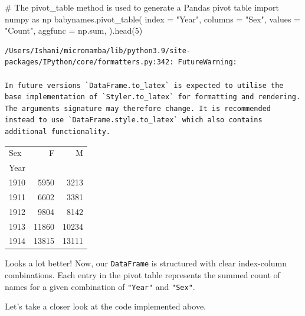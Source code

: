 \documentclass[
  letterpaper,
  DIV=11,
  numbers=noendperiod]{scrreprt}
\newenvironment{Shaded}{\begin{snugshade}}{\end{snugshade}}
\newcommand{\BuiltInTok}[1]{\textcolor[rgb]{0.00,0.23,0.31}{#1}}
\newcommand{\CommentTok}[1]{\textcolor[rgb]{0.37,0.37,0.37}{#1}}
\newcommand{\DecValTok}[1]{\textcolor[rgb]{0.68,0.00,0.00}{#1}}
\newcommand{\ImportTok}[1]{\textcolor[rgb]{0.00,0.46,0.62}{#1}}
\newcommand{\NormalTok}[1]{\textcolor[rgb]{0.00,0.23,0.31}{#1}}
\newcommand{\OperatorTok}[1]{\textcolor[rgb]{0.37,0.37,0.37}{#1}}
\newcommand{\StringTok}[1]{\textcolor[rgb]{0.13,0.47,0.30}{#1}}
\begin{document}
\begin{Shaded}
\begin{Highlighting}[]
\CommentTok{\# The \textasciigrave{}pivot\_table\textasciigrave{} method is used to generate a Pandas pivot table}
\ImportTok{import}\NormalTok{ numpy }\ImportTok{as}\NormalTok{ np}
\NormalTok{babynames.pivot\_table(}
\NormalTok{    index }\OperatorTok{=} \StringTok{"Year"}\NormalTok{,}
\NormalTok{    columns }\OperatorTok{=} \StringTok{"Sex"}\NormalTok{,    }
\NormalTok{    values }\OperatorTok{=} \StringTok{"Count"}\NormalTok{, }
\NormalTok{    aggfunc }\OperatorTok{=}\NormalTok{ np.}\BuiltInTok{sum}\NormalTok{, }
\NormalTok{).head(}\DecValTok{5}\NormalTok{)}
\end{Highlighting}
\end{Shaded}

\begin{verbatim}
/Users/Ishani/micromamba/lib/python3.9/site-packages/IPython/core/formatters.py:342: FutureWarning:

In future versions `DataFrame.to_latex` is expected to utilise the base implementation of `Styler.to_latex` for formatting and rendering. The arguments signature may therefore change. It is recommended instead to use `DataFrame.style.to_latex` which also contains additional functionality.
\end{verbatim}

\begin{tabular}{lrr}
\toprule
Sex &      F &      M \\
Year &        &        \\
\midrule
1910 &   5950 &   3213 \\
1911 &   6602 &   3381 \\
1912 &   9804 &   8142 \\
1913 &  11860 &  10234 \\
1914 &  13815 &  13111 \\
\bottomrule
\end{tabular}

Looks a lot better! Now, our \texttt{DataFrame} is structured with clear
index-column combinations. Each entry in the pivot table represents the
summed count of names for a given combination of \texttt{"Year"} and
\texttt{"Sex"}.

Let's take a closer look at the code implemented above.
\end{document}

